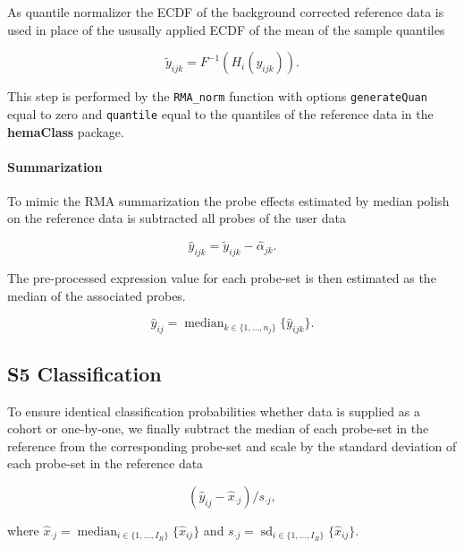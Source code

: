 \documentclass[10pt,letterpaper]{article}
\newcommand{\pkg}[1]{\textbf{#1}}
\DeclareMathOperator*{\median}{median}
\DeclareMathOperator*{\sd}{sd}
\begin{document}
As quantile normalizer the ECDF of the background corrected reference data is used in place of the ususally applied ECDF of the mean of the sample quantiles

\begin{equation*}
   \tilde{y}_{ijk} = F^{-1}(H_i(y_{ijk})).
\end{equation*}

This step is performed by the \texttt{RMA\_norm} function with options \texttt{generateQuan} equal to zero and \texttt{quantile} equal to the quantiles of the reference data in the \pkg{hemaClass} package.


\paragraph{Summarization}

To mimic the RMA summarization the probe effects estimated by median polish on the reference data is subtracted all probes of the user data

\begin{equation*}
   \hat{y}_{ijk} = \tilde{y}_{ijk} - \hat{\alpha}_{jk}.
\end{equation*}

The pre-processed expression value for each probe-set is then estimated as the median of the associated probes.

\begin{equation*}
   \hat{y}_{ij} = \median_{k \in \{1,\dots,n_j \}} \{ \hat{y}_{ijk} \}.
\end{equation*}


\subsection*{S5 Classification}
To ensure identical classification probabilities whether data is supplied as a cohort or one-by-one, we finally subtract the median of each probe-set in the reference from the corresponding probe-set and scale by the standard deviation of each probe-set in the reference data

\begin{equation*}
  (\hat{y}_{ij} - \hat{x}_{\cdot j})/s_{\cdot j},
\end{equation*}

where
$\hat{x}_{\cdot j} = \median_{i \in \{1,\dots,I_R \}} \{\hat{x}_{ij}\}$ and
$s_{\cdot j} = \sd_{i \in \{1,\dots,I_R\}} \{\hat{x}_{ij}\}$.
\end{document}
